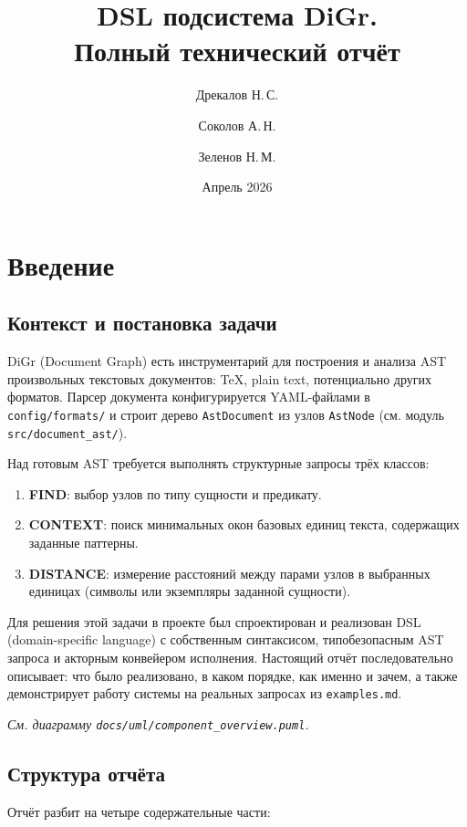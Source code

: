 \documentclass[12pt,a4paper]{article}
\title{DSL подсистема DiGr.\\ Полный технический отчёт}
\author{Дрекалов Н.\,С. \and Соколов А.\,Н. \and Зеленов Н.\,М.}
\date{Апрель 2026}
\newcommand{\uml}[1]{\textit{См. диаграмму \texttt{docs/uml/#1}.}}
\newcommand{\code}[1]{\texttt{#1}}
\begin{document}
\maketitle
\tableofcontents
\newpage

\section{Введение}

\subsection{Контекст и постановка задачи}

DiGr (Document Graph) есть инструментарий для построения и анализа AST
произвольных текстовых документов: TeX, plain text, потенциально других
форматов. Парсер документа конфигурируется YAML-файлами в
\code{config/formats/} и строит дерево \code{AstDocument} из узлов
\code{AstNode} (см. модуль \code{src/document\_ast/}).

Над готовым AST требуется выполнять структурные запросы трёх классов:

\begin{enumerate}
  \item \textbf{FIND}: выбор узлов по типу сущности и предикату.
  \item \textbf{CONTEXT}: поиск минимальных окон базовых единиц
        текста, содержащих заданные паттерны.
  \item \textbf{DISTANCE}: измерение расстояний между парами
        узлов в выбранных единицах (символы или экземпляры заданной
        сущности).
\end{enumerate}

Для решения этой задачи в проекте был спроектирован и реализован
DSL (domain-specific language) с собственным синтаксисом, типобезопасным
AST запроса и акторным конвейером исполнения. Настоящий отчёт
последовательно описывает: что было реализовано, в каком порядке, как
именно и зачем, а также демонстрирует работу системы на реальных
запросах из \code{examples.md}.

\uml{component\_overview.puml}

\subsection{Структура отчёта}

Отчёт разбит на четыре содержательные части:
\end{document}
